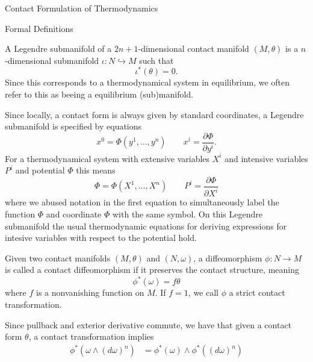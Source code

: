 \begin{section}{Contact Formulation of Thermodynamics}
\begin{subsection}{Formal Definitions}
\begin{definition}
\end{definition}
\begin{definition}
	A Legendre submanifold of a $2n+1$-dimensional contact manifold $(M,\theta)$ is a $n$-dimensional submanifold $\iota:N\hookrightarrow M$ such that 
	\begin{equation}
		\iota^*(\theta)=0.
	\end{equation}
	Since this corresponds to a thermodynamical system in equilibrium, we often refer to this as beeing a equilibrium (sub)manifold.
\end{definition}
\begin{corollary}
	Since locally, a contact form is always given by standard coordinates, a Legendre submanifold is specified by equations
	\begin{equation}
		x^0=\Phi(y^1,\dots,y^n) \hspace{2em} x^i=\frac{\partial\Phi}{\partial y^i}.
	\end{equation}
	For a thermodynamical system with extensive variables $X^i$ and intensive variables $P^i$ and potential $\Phi$ this means
	\begin{equation}
		\Phi=\Phi(X^1,\dots,X^n) \hspace{2em} P^i=\frac{\partial\Phi}{\partial X^i}
	\end{equation}
	where we abused notation in the first equation to simultaneously label the function $\Phi$ and coordinate $\Phi$ with the same symbol. On this Legendre submanifold the usual thermodynamic equations for deriving expressions for intesive variables with respect to the potential hold.
\end{corollary}
\begin{definition}
	Given two contact manifolds $(M,\theta)$ and $(N,\omega)$, a diffeomorphism $\phi:N\rightarrow M$ is called a contact diffeomorphism if it preserves the contact structure, meaning
	\begin{equation}
		\phi^*(\omega)=f\theta
	\end{equation}
	where $f$ is a nonvanishing function on $M$. If $f=1$, we call $\phi$ a strict contact transformation.
\end{definition}
\begin{corollary}
	Since pullback and exterior derivative commute, we have that given a contact form $\theta$, a contact transformation implies
	\begin{align*}
		\phi^*(\omega\wedge(d\omega)^n) 	&= \phi^*(\omega)\wedge\phi^*((d\omega)^n)\\

\end{align*}
\end{corollary}
\end{subsection}
\end{section}
